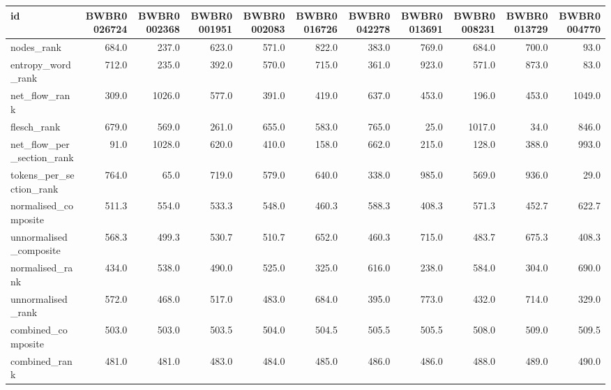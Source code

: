 \begin{tabular}{lrrrrrrrrrr}
\toprule
id & BWBR0026724 & BWBR0002368 & BWBR0001951 & BWBR0002083 & BWBR0016726 & BWBR0042278 & BWBR0013691 & BWBR0008231 & BWBR0013729 & BWBR0004770 \\
\midrule
nodes\_rank & 684.0 & 237.0 & 623.0 & 571.0 & 822.0 & 383.0 & 769.0 & 684.0 & 700.0 & 93.0 \\
\cline{1-11}
entropy\_word\_rank & 712.0 & 235.0 & 392.0 & 570.0 & 715.0 & 361.0 & 923.0 & 571.0 & 873.0 & 83.0 \\
\cline{1-11}
net\_flow\_rank & 309.0 & 1026.0 & 577.0 & 391.0 & 419.0 & 637.0 & 453.0 & 196.0 & 453.0 & 1049.0 \\
\cline{1-11}
flesch\_rank & 679.0 & 569.0 & 261.0 & 655.0 & 583.0 & 765.0 & 25.0 & 1017.0 & 34.0 & 846.0 \\
\cline{1-11}
net\_flow\_per\_section\_rank & 91.0 & 1028.0 & 620.0 & 410.0 & 158.0 & 662.0 & 215.0 & 128.0 & 388.0 & 993.0 \\
\cline{1-11}
tokens\_per\_section\_rank & 764.0 & 65.0 & 719.0 & 579.0 & 640.0 & 338.0 & 985.0 & 569.0 & 936.0 & 29.0 \\
\cline{1-11}
normalised\_composite & 511.3 & 554.0 & 533.3 & 548.0 & 460.3 & 588.3 & 408.3 & 571.3 & 452.7 & 622.7 \\
\cline{1-11}
unnormalised\_composite & 568.3 & 499.3 & 530.7 & 510.7 & 652.0 & 460.3 & 715.0 & 483.7 & 675.3 & 408.3 \\
\cline{1-11}
normalised\_rank & 434.0 & 538.0 & 490.0 & 525.0 & 325.0 & 616.0 & 238.0 & 584.0 & 304.0 & 690.0 \\
\cline{1-11}
unnormalised\_rank & 572.0 & 468.0 & 517.0 & 483.0 & 684.0 & 395.0 & 773.0 & 432.0 & 714.0 & 329.0 \\
\cline{1-11}
combined\_composite & 503.0 & 503.0 & 503.5 & 504.0 & 504.5 & 505.5 & 505.5 & 508.0 & 509.0 & 509.5 \\
\cline{1-11}
combined\_rank & 481.0 & 481.0 & 483.0 & 484.0 & 485.0 & 486.0 & 486.0 & 488.0 & 489.0 & 490.0 \\
\cline{1-11}
\bottomrule
\end{tabular}
